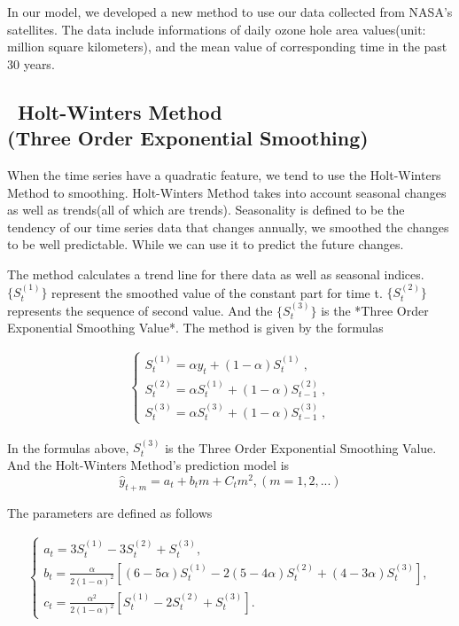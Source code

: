 \documentclass[12pt]{article}
\begin{document}
In our model, we developed a new method to use our data collected from NASA's satellites. The data include informations of daily ozone hole area values(unit: million square  kilometers), and the mean value of corresponding time in the past 30 years.

\subsection{\ Holt-Winters Method \\(Three Order Exponential Smoothing)
}


When the time series have a quadratic feature, we tend to use the Holt-Winters Method to smoothing. Holt-Winters Method takes into account seasonal changes as well as trends(all of which are trends). Seasonality is defined to be the tendency of our time series data that  changes  annually, we  smoothed the changes to be well predictable. While we can use it to predict the future changes.\cite{chatfield1988holt}\cite{newman2006will}

The method calculates a trend line for there data as well as seasonal indices. $\{S_t^{(1)}\}$ represent the smoothed value of the constant part for time t. $\{S_t^{(2)}\}$ represents the sequence of second value. And the $\{S_t^{(3)}\}$ is the *Three Order Exponential Smoothing Value*. The method is given by the formulas 

\begin{eqnarray}
\left\{
\begin{array}{ll}
 S^{(1)}_t=\alpha y_t+(1-\alpha)S_t^{(1)}  \  , \\
 S^{(2)}_t=\alpha S^{(1)}_t +(1-\alpha)S_{t-1}^{(2)} \  ,\\
 S^{(3)}_t = \alpha S^{(3)}_t +(1-\alpha)S^{(3)}_{t-1}\ ,
\end{array}\right.\label{equ:dynamicofcollision}
\end{eqnarray}

 In the formulas above, $S^{(3)}_t$ is the Three Order Exponential Smoothing Value. And the Holt-Winters Method's prediction model is
$$
\hat y_{t+m} = a_t + b_tm + C_t m^2, (m = 1,2,...)
$$

The parameters are defined as follows

\begin{eqnarray}
\left \{
  \begin{array}{ll}
  a_t = 3S_t^{(1)} - 3S_t^{(2)} +S_t^{(3)}, \\
  b_t = \frac{\alpha}{2(1-\alpha)^2}[(6-5\alpha)S_t^{(1)} - 2(5-4\alpha)S_t^{(2)}+(4-3\alpha)S_t^{(3)}], \\
  c_t=\frac{\alpha^2}{2(1-\alpha)^2}[S_t^{(1)}-2S_t^{(2)}+S_t^{(3)}].
 
\end{array} \right .
\end{eqnarray}
\end{document}
